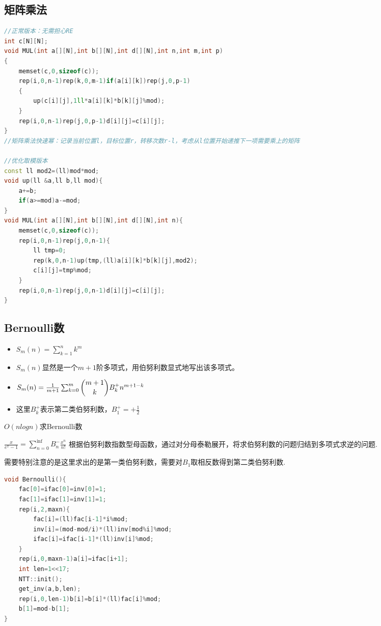 \documentclass[UTF8,a4paper,titlepage]{ctexart}
\begin{document}
\subsection{矩阵乘法}
\begin{lstlisting}[language=C++]
//正常版本：无需担心RE
int c[N][N];
void MUL(int a[][N],int b[][N],int d[][N],int n,int m,int p)
{
	memset(c,0,sizeof(c));
	rep(i,0,n-1)rep(k,0,m-1)if(a[i][k])rep(j,0,p-1)
	{	
		up(c[i][j],1ll*a[i][k]*b[k][j]%mod);
	}
	rep(i,0,n-1)rep(j,0,p-1)d[i][j]=c[i][j];
}
//矩阵乘法快速幂：记录当前位置l，目标位置r，转移次数r-l，考虑从l位置开始递推下一项需要乘上的矩阵

//优化取模版本
const ll mod2=(ll)mod*mod;
void up(ll &a,ll b,ll mod){
	a+=b;
	if(a>=mod)a-=mod;
}
void MUL(int a[][N],int b[][N],int d[][N],int n){
	memset(c,0,sizeof(c));
	rep(i,0,n-1)rep(j,0,n-1){
		ll tmp=0;
		rep(k,0,n-1)up(tmp,(ll)a[i][k]*b[k][j],mod2);
		c[i][j]=tmp%mod;
	}
	rep(i,0,n-1)rep(j,0,n-1)d[i][j]=c[i][j];
}
\end{lstlisting}

\subsection{Bernoulli数}
\begin{itemize}
\item $S_m(n)=\sum_{k=1}^{n}k^m$
\item $S_m(n)$显然是一个$m+1$阶多项式，用伯努利数显式地写出该多项式。
\item $S_m(n)= \frac{1}{m+1} \sum_{k=0}^{m} \dbinom{m+1}{k}B_{k}^{+}n^{m+1-k}$
\item 这里$B_{k}^{+}$表示第二类伯努利数，$B_1^+=+\frac{1}{2}$
\end{itemize}

$O(nlogn)$求Bernoulli数

$\frac{x}{e^x-1}=\sum_{n=0}^{\inf}B_n^-\frac{x^n}{n!}$
根据伯努利数指数型母函数，通过对分母泰勒展开，将求伯努利数的问题归结到多项式求逆的问题.

需要特别注意的是这里求出的是第一类伯努利数，需要对$B_1$取相反数得到第二类伯努利数.

\begin{lstlisting}[language=C++] 
void Bernoulli(){
    fac[0]=ifac[0]=inv[0]=1;
    fac[1]=ifac[1]=inv[1]=1;
    rep(i,2,maxn){
        fac[i]=(ll)fac[i-1]*i%mod;
        inv[i]=(mod-mod/i)*(ll)inv[mod%i]%mod;
        ifac[i]=ifac[i-1]*(ll)inv[i]%mod;
    }
    rep(i,0,maxn-1)a[i]=ifac[i+1];
    int len=1<<17;
    NTT::init();
    get_inv(a,b,len);
    rep(i,0,len-1)b[i]=b[i]*(ll)fac[i]%mod;
    b[1]=mod-b[1];
}
\end{lstlisting}
\end{document}
